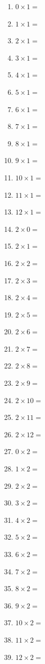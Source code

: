 \documentclass{article}
\begin{document}
\begin{multicols}{4}
\begin{enumerate}
\item $0 \times 1 =$
\item $1 \times 1 =$
\item $2 \times 1 =$
\item $3 \times 1 =$
\item $4 \times 1 =$
\item $5 \times 1 =$
\item $6 \times 1 =$
\item $7 \times 1 =$
\item $8 \times 1 =$
\item $9 \times 1 =$
\item $10 \times 1 =$
\item $11 \times 1 =$
\item $12 \times 1 =$

\item $2 \times 0 =$
\item $2 \times 1 =$
\item $2 \times 2 =$
\item $2 \times 3 =$
\item $2 \times 4 =$
\item $2 \times 5 =$
\item $2 \times 6 =$
\item $2 \times 7 =$
\item $2 \times 8 =$
\item $2 \times 9 =$
\item $2 \times 10 =$
\item $2 \times 11 =$
\item $2 \times 12 =$

\item $0 \times 2 =$
\item $1 \times 2 =$
\item $2 \times 2 =$
\item $3 \times 2 =$
\item $4 \times 2 =$
\item $5 \times 2 =$
\item $6 \times 2 =$
\item $7 \times 2 =$
\item $8 \times 2 =$
\item $9 \times 2 =$
\item $10 \times 2 =$
\item $11 \times 2 =$
\item $12 \times 2 =$


\end{enumerate}
\end{multicols}
\end{document}
